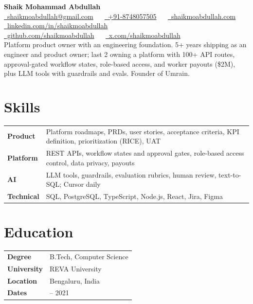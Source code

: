 \documentclass[letterpaper,10.5pt]{article}
\newcommand{\skill}[2]{\textbf{#1} & #2 \\}
\begin{document}
\begin{center}
  {\Huge\bfseries Shaik Mohammad Abdullah}\\[4pt]
  {\footnotesize
    \href{mailto:shaikmoabdullah@gmail.com}{\faEnvelope\ shaikmoabdullah@gmail.com} \ \textbar\ %
    \href{https://wa.me/918748057505}{\faWhatsapp\ +91-8748057505} \ \textbar\ %
    \href{https://shaikmoabdullah.com}{\faGlobe\ shaikmoabdullah.com} \ \textbar\ %
    \mbox{\href{https://linkedin.com/in/shaikmoabdullah}{\faLinkedin\ linkedin.com/in/shaikmoabdullah}}\\
    \mbox{\href{https://github.com/shaikmoabdullah}{\faGithub\ github.com/shaikmoabdullah}} \ \textbar\ %
    \mbox{\href{https://x.com/shaikmoabdullah}{\faTwitter\ x.com/shaikmoabdullah}}
  }\\[3pt]
  {\small Platform product owner with an engineering foundation. 5+ years shipping as an engineer and product owner; last 2 owning a platform with 100+ API routes, approval-gated workflow states, role-based access, and worker payouts (\$2M), plus LLM tools with guardrails and evals. Founder of Umrain.}
\end{center}

\noindent
\begin{minipage}[t]{0.66\textwidth}
\section{Skills}
\begin{tabularx}{\linewidth}{@{}l >{\raggedright\arraybackslash}X@{}}
  \skill{Product}{Platform roadmaps, PRDs, user stories, acceptance criteria, KPI definition, prioritization (RICE), UAT}
  \skill{Platform}{REST APIs, workflow states and approval gates, role-based access control, data privacy, payouts}
  \skill{AI}{LLM tools, guardrails, evaluation rubrics, human review, text-to-SQL; Cursor daily}
  \skill{Technical}{SQL, PostgreSQL, TypeScript, Node.js, React, Jira, Figma}
\end{tabularx}
\end{minipage}\hfill
\begin{minipage}[t]{0.31\textwidth}
\section{Education}
\begin{tabularx}{\linewidth}{@{}l >{\raggedright\arraybackslash}X@{}}
  \skill{Degree}{B.Tech, Computer Science}
  \skill{University}{REVA University}
  \skill{Location}{Bengaluru, India}
  \skill{Dates}{2017 -- 2021}
\end{tabularx}
\end{minipage}
\end{document}
